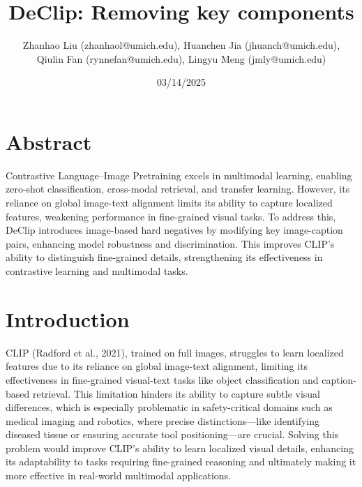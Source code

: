 \documentclass[11pt,letterpaper]{article}
\begin{document}
\title{DeClip: Removing key components }


\author{
Zhanhao Liu (zhanhaol@umich.edu),
Huanchen Jia (jhuanch@umich.edu),\\
Qiulin Fan (rynnefan@umich.edu),
Lingyu Meng (jmly@umich.edu)\\
}

\date{03/14/2025}


\maketitle

\section{Abstract}
Contrastive Language–Image Pretraining excels in multimodal learning, enabling zero-shot classification, cross-modal retrieval, and transfer learning. However, its reliance on global image-text alignment limits its ability to capture localized features, weakening performance in fine-grained visual tasks. To address this, DeClip introduces image-based hard negatives by modifying key image-caption pairs, enhancing model robustness and discrimination. This improves CLIP’s ability to distinguish fine-grained details, strengthening its effectiveness in contrastive learning and multimodal tasks.

\section{Introduction}
CLIP\cite{radford2021learningtransferablevisualmodels} (Radford et al., 2021), trained on full images, struggles to learn localized features due to its reliance on global image-text alignment, limiting its effectiveness in fine-grained visual-text tasks like object classification and caption-based retrieval. This limitation hinders its ability to capture subtle visual differences, which is especially problematic in safety-critical domains such as medical imaging and robotics, where precise distinctions—like identifying diseased tissue or ensuring accurate tool positioning—are crucial. Solving this problem would improve CLIP’s ability to learn localized visual details, enhancing its adaptability to tasks requiring fine-grained reasoning and ultimately making it more effective in real-world multimodal applications.
    



\end{document}

